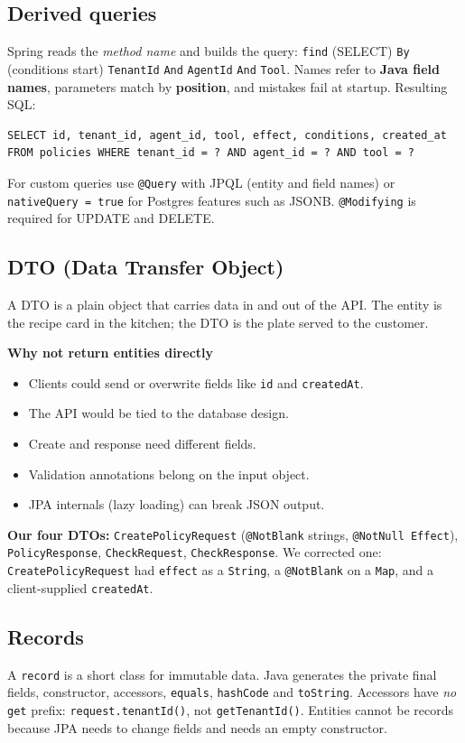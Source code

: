 \documentclass[11pt,a4paper]{article}
\newcommand{\code}[1]{\texttt{\small #1}}
\begin{document}
\subsection{Derived queries}
Spring reads the \emph{method name} and builds the query:
\code{find} (SELECT) \code{By} (conditions start) \code{TenantId} \code{And} \code{AgentId} \code{And} \code{Tool}.
Names refer to \textbf{Java field names}, parameters match by \textbf{position}, and
mistakes fail at startup. Resulting SQL:

\begin{lstlisting}[style=sql]
SELECT id, tenant_id, agent_id, tool, effect, conditions, created_at
FROM policies WHERE tenant_id = ? AND agent_id = ? AND tool = ?
\end{lstlisting}

For custom queries use \code{@Query} with JPQL (entity and field names) or
\code{nativeQuery = true} for Postgres features such as JSONB. \code{@Modifying} is
required for UPDATE and DELETE.

\subsection{DTO (Data Transfer Object)}
A DTO is a plain object that carries data in and out of the API. The entity is the recipe
card in the kitchen; the DTO is the plate served to the customer.

\textbf{Why not return entities directly}
\begin{itemize}
  \item Clients could send or overwrite fields like \code{id} and \code{createdAt}.
  \item The API would be tied to the database design.
  \item Create and response need different fields.
  \item Validation annotations belong on the input object.
  \item JPA internals (lazy loading) can break JSON output.
\end{itemize}

\textbf{Our four DTOs:} \code{CreatePolicyRequest} (\code{@NotBlank} strings, \code{@NotNull Effect}),
\code{PolicyResponse}, \code{CheckRequest}, \code{CheckResponse}.
We corrected one: \code{CreatePolicyRequest} had \code{effect} as a \code{String}, a
\code{@NotBlank} on a \code{Map}, and a client-supplied \code{createdAt}.

\subsection{Records}
A \code{record} is a short class for immutable data. Java generates the private final
fields, constructor, accessors, \code{equals}, \code{hashCode} and \code{toString}.
Accessors have \emph{no} \code{get} prefix: \code{request.tenantId()}, not \code{getTenantId()}.
Entities cannot be records because JPA needs to change fields and needs an empty constructor.
\end{document}
